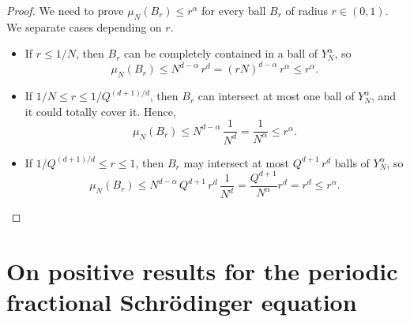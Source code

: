 \documentclass[11pt,reqno]{amsart}
\theoremstyle{definition}
\numberwithin{equation}{section}
\theoremstyle{remark}
\begin{document}
\begin{proof}
We need to prove $\mu_N(B_r) \leq r^\alpha$ for every ball $B_r$ of radius $r \in (0,1)$.
We separate cases depending on $r$.
\begin{itemize}
    \item  If $r \leq 1/N$, then $B_r$ can be completely contained in a ball of $Y_N^\alpha$, so 
    \[
    \mu_N(B_r) \leq N^{d-\alpha} \, r^d
    = (rN)^{d-\alpha} \, r^\alpha 
    \leq r^\alpha. 
    \]

    \item If $1/N \leq r \leq 1/Q^{(d+1)/d}$, then $B_r$ can intersect at most one ball of $Y_N^\alpha$, and it could totally cover it. Hence, 
    \[
    \mu_N(B_r) \leq N^{d-\alpha} \, \frac{1}{N^d}
    = \frac{1}{N^\alpha}
    \leq r^\alpha. 
    \]

    \item If $1/Q^{(d+1)/d} \leq r \leq 1$, then $B_r$ may intersect at most $Q^{d+1}\, r^d$ balls of $Y_N^\alpha$, so
    \[
    \mu_N(B_r) \leq N^{d-\alpha}\, Q^{d+1} \, r^d\, \frac{1}{N^d}
    = \frac{Q^{d+1}}{N^\alpha} r^d
    = r^d \leq r^\alpha. 
    \]
\end{itemize}
\end{proof}



\appendix

\section{On positive results for the periodic fractional Schr\"odinger equation}\label{sec:Positive_Result_Details}
\end{document}

